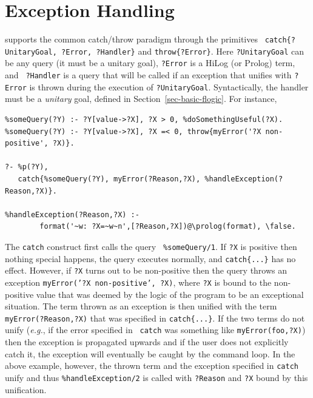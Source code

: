 \documentclass[11pt]{article}
\newcommand{\ERGO}{\mbox{\smaller{\ensuremath{\cal{E}}\smaller{{\sc{RGO}}}}}\xspace}
\newcommand{\FLSYSTEM}{\ERGO}
\begin{document}
\section{Exception Handling}\label{sec-errors}

\FLSYSTEM supports the common catch/throw paradigm through the primitives {\tt
  catch\{?UnitaryGoal, ?Error, ?Handler\}} and {\tt throw\{?Error\}}.  Here
{\tt ?UnitaryGoal}
can be any \FLSYSTEM query (it must be a unitary goal), {\tt ?Error} is a HiLog (or Prolog) term, and {\tt
  ?Handler} is a \FLSYSTEM query that will be called if an exception that
unifies with {\tt ?Error} is thrown during the execution of {\tt ?UnitaryGoal}. 
Syntactically, the handler must be a \emph{unitary} goal, defined in
Section~\ref{sec-basic-flogic}.
For instance,

\begin{verbatim}
%someQuery(?Y) :- ?Y[value->?X], ?X > 0, %doSomethingUseful(?X).  
%someQuery(?Y) :- ?Y[value->?X], ?X =< 0, throw{myError('?X non-positive', ?X)}.

?- %p(?Y),
   catch{%someQuery(?Y), myError(?Reason,?X), %handleException(?Reason,?X)}.

%handleException(?Reason,?X) :-
        format('~w: ?X=~w~n',[?Reason,?X])@\prolog(format), \false.
\end{verbatim}
The {\tt catch} construct first calls the query {\tt
  \verb|%|someQuery/1}. If {\tt ?X} is positive then nothing special
  happens, the query executes normally, and {\tt catch\{...\}} has no
  effect.  However, if {\tt ?X} turns out to be non-positive then the
  query throws an exception {\tt myError('?X {\tt non-positive', ?X)}},
  where {\tt ?X} is bound to the non-positive value that was deemed by
  the logic of the program to be an exceptional situation.  The term
  thrown as an exception is then unified with the term {\tt
  myError(?Reason,?X)} that was specified in {\tt catch\{...\}}. If the
  two terms do not unify ({\it e.g.}, if the error specified in {\tt
  catch} was something like {\tt myError(foo,?X)}) then the exception is
  propagated upwards and if the user does not explicitly catch it, the
  exception will eventually be caught by the \FLSYSTEM command loop. In the
  above example,
  however, the thrown term and the exception specified in
  {\tt catch} unify and thus {\tt \verb|%|handleException/2} is called
  with {\tt ?Reason} and {\tt ?X} bound by this unification.
\end{document}
